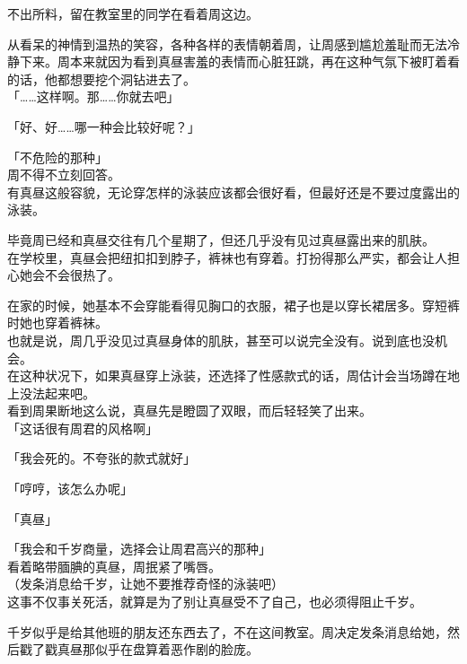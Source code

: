 不出所料，留在教室里的同学在看着周这边。

从看呆的神情到温热的笑容，各种各样的表情朝着周，让周感到尴尬羞耻而无法冷静下来。周本来就因为看到真昼害羞的表情而心脏狂跳，再在这种气氛下被盯着看的话，他都想要挖个洞钻进去了。\\

「……这样啊。那……你就去吧」

「好、好……哪一种会比较好呢？」

「不危险的那种」\\

周不得不立刻回答。\\

有真昼这般容貌，无论穿怎样的泳装应该都会很好看，但最好还是不要过度露出的泳装。

毕竟周已经和真昼交往有几个星期了，但还几乎没有见过真昼露出来的肌肤。\\

在学校里，真昼会把纽扣扣到脖子，裤袜也有穿着。打扮得那么严实，都会让人担心她会不会很热了。

在家的时候，她基本不会穿能看得见胸口的衣服，裙子也是以穿长裙居多。穿短裤时她也穿着裤袜。\\

也就是说，周几乎没见过真昼身体的肌肤，甚至可以说完全没有。说到底也没机会。\\

在这种状况下，如果真昼穿上泳装，还选择了性感款式的话，周估计会当场蹲在地上没法起来吧。\\

看到周果断地这么说，真昼先是瞪圆了双眼，而后轻轻笑了出来。\\

「这话很有周君的风格啊」

「我会死的。不夸张的款式就好」

「哼哼，该怎么办呢」

「真昼」

「我会和千岁商量，选择会让周君高兴的那种」\\

看着略带腼腆的真昼，周抿紧了嘴唇。\\

（发条消息给千岁，让她不要推荐奇怪的泳装吧）\\

这事不仅事关死活，就算是为了别让真昼受不了自己，也必须得阻止千岁。

千岁似乎是给其他班的朋友还东西去了，不在这间教室。周决定发条消息给她，然后戳了戳真昼那似乎在盘算着恶作剧的脸庞。
